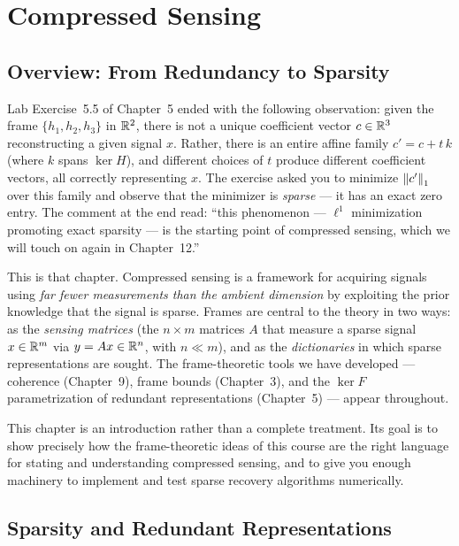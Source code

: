 \chapter{Compressed Sensing}
\label{ch:compressed-sensing}
\section{Overview: From Redundancy to Sparsity}
\label{sec:ch12-overview}

Lab Exercise~5.5 of Chapter~5 ended with the following observation: given
the frame $\{h_1,h_2,h_3\}$ in $\mathbb{R}^2$, there is not a unique coefficient
vector $c\in\mathbb{R}^3$ reconstructing a given signal $x$. Rather, there is an
entire affine family $c' = c + t\,k$ (where $k$ spans $\ker H$), and
different choices of $t$ produce different coefficient vectors, all
correctly representing $x$. The exercise asked you to minimize $\left\| c' \right\|_1$
over this family and observe that the minimizer is \emph{sparse} --- it has
an exact zero entry. The comment at the end read: ``this phenomenon ---
$\ell^1$ minimization promoting exact sparsity --- is the starting point
of compressed sensing, which we will touch on again in Chapter~12.''

This is that chapter. Compressed sensing is a framework for acquiring
signals using \emph{far fewer measurements than the ambient dimension}
by exploiting the prior knowledge that the signal is sparse.
Frames are central to the theory in two ways: as the \emph{sensing
matrices} (the $n\times m$ matrices $A$ that measure a sparse signal
$x\in\mathbb{R}^m$ via $y = Ax\in\mathbb{R}^n$, with $n\ll m$), and as the
\emph{dictionaries} in which sparse representations are sought. The
frame-theoretic tools we have developed --- coherence (Chapter~9),
frame bounds (Chapter~3), and the $\ker F$ parametrization of redundant
representations (Chapter~5) --- appear throughout.

This chapter is an introduction rather than a complete treatment. Its
goal is to show precisely how the frame-theoretic ideas of this course
are the right language for stating and understanding compressed sensing,
and to give you enough machinery to implement and test sparse recovery
algorithms numerically.

\section{Sparsity and Redundant Representations}
\label{sec:sparsity}

